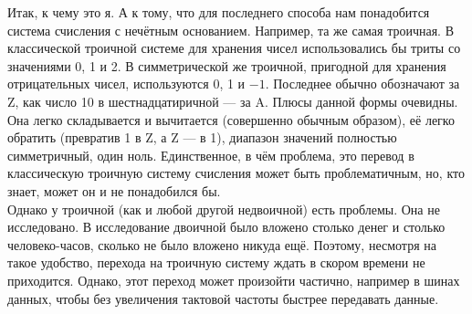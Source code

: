 \documentclass{article}
\begin{document}
    Итак, к чему это я. А к тому, что для последнего способа нам понадобится система счисления с нечётным основанием. Например, та же самая троичная. В классической троичной системе для хранения чисел использовались бы триты со значениями 0, 1 и 2. В симметрической же троичной, пригодной для хранения отрицательных чисел, используются 0, 1 и $-1$. Последнее обычно обозначают за Z, как число 10 в шестнадцатиричной --- за A. Плюсы данной формы очевидны. Она легко складывается и вычитается (совершенно обычным образом), её легко обратить (превратив 1 в Z, а Z --- в 1), диапазон значений полностью симметричный, один ноль. Единственное, в чём проблема, это перевод в классическую троичную систему счисления может быть проблематичным, но, кто знает, может он и не понадобился бы.\\
    Однако у троичной (как и любой другой недвоичной) есть проблемы. Она не исследовано. В исследование двоичной было вложено столько денег и столько человеко-часов, сколько не было вложено никуда ещё. Поэтому, несмотря на такое удобство, перехода на троичную систему ждать в скором времени не приходится. Однако, этот переход может произойти частично, например в шинах данных, чтобы без увеличения тактовой частоты быстрее передавать данные.
\end{document}
